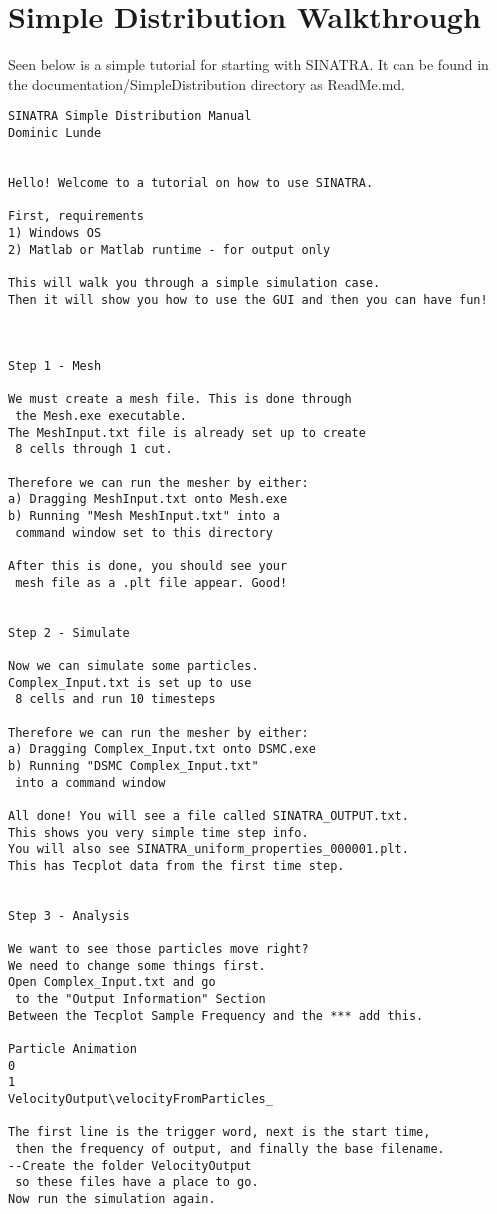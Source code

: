 \chapter{Simple Distribution Walkthrough}
\label{app:walkthrough}
Seen below is a simple tutorial for starting with SINATRA. It can be found in the documentation/SimpleDistribution directory as ReadMe.md. 

\begin{verbatim}
SINATRA Simple Distribution Manual
Dominic Lunde


Hello! Welcome to a tutorial on how to use SINATRA.

First, requirements
1) Windows OS
2) Matlab or Matlab runtime - for output only

This will walk you through a simple simulation case. 
Then it will show you how to use the GUI and then you can have fun!



Step 1 - Mesh

We must create a mesh file. This is done through
 the Mesh.exe executable.
The MeshInput.txt file is already set up to create
 8 cells through 1 cut.
 
Therefore we can run the mesher by either:
a) Dragging MeshInput.txt onto Mesh.exe
b) Running "Mesh MeshInput.txt" into a
 command window set to this directory

After this is done, you should see your
 mesh file as a .plt file appear. Good!


Step 2 - Simulate

Now we can simulate some particles. 
Complex_Input.txt is set up to use
 8 cells and run 10 timesteps

Therefore we can run the mesher by either:
a) Dragging Complex_Input.txt onto DSMC.exe
b) Running "DSMC Complex_Input.txt"
 into a command window

All done! You will see a file called SINATRA_OUTPUT.txt.
This shows you very simple time step info. 
You will also see SINATRA_uniform_properties_000001.plt.
This has Tecplot data from the first time step.


Step 3 - Analysis

We want to see those particles move right? 
We need to change some things first.
Open Complex_Input.txt and go
 to the "Output Information" Section
Between the Tecplot Sample Frequency and the *** add this.

Particle Animation
0
1
VelocityOutput\velocityFromParticles_

The first line is the trigger word, next is the start time,
 then the frequency of output, and finally the base filename.
--Create the folder VelocityOutput 
 so these files have a place to go. 
Now run the simulation again. 


\end{verbatim}
